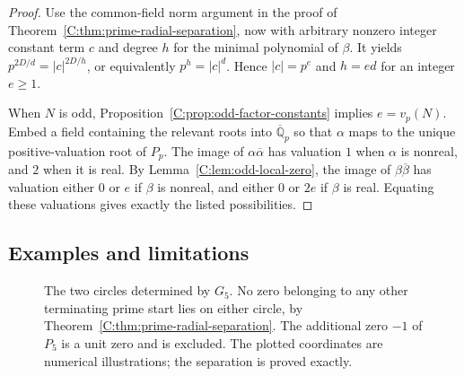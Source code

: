 \documentclass[11pt,a4paper]{article}
\theoremstyle{definition}
\theoremstyle{remark}
\numberwithin{equation}{section}
\begin{document}
\begin{proof}
Use the common-field norm argument in the proof of
Theorem~\ref{C:thm:prime-radial-separation}, now with arbitrary nonzero
integer constant term $c$ and degree $h$ for the minimal polynomial
of $\beta$. It yields $p^{2D/d}=|c|^{2D/h}$, or equivalently
$p^h=|c|^d$. Hence $|c|=p^e$ and $h=ed$ for an integer $e\geq1$.

When $N$ is odd, Proposition~\ref{C:prop:odd-factor-constants} implies
$e=v_p(N)$. Embed a field containing the relevant roots into
$\overline{\mathbb Q}_p$ so that $\alpha$ maps to the unique
positive-valuation root of $P_p$. The image of
$\alpha\overline\alpha$ has valuation $1$ when $\alpha$ is nonreal,
and $2$ when it is real. By Lemma~\ref{C:lem:odd-local-zero}, the image
of $\beta\overline\beta$ has valuation either $0$ or $e$ if $\beta$
is nonreal, and either $0$ or $2e$ if $\beta$ is real. Equating these
valuations gives exactly the listed possibilities.
\end{proof}

\subsection{Examples and limitations}


\begin{figure}[htbp]
\centering
{}
\caption{The two circles determined by $G_5$. No zero belonging to
any other terminating prime start lies on either circle, by
Theorem~\ref{C:thm:prime-radial-separation}. The additional zero $-1$
of $P_5$ is a unit zero and is excluded. The plotted coordinates are
numerical illustrations; the separation is proved exactly.}
\label{C:fig:p5-circles}
\end{figure}
\end{document}
